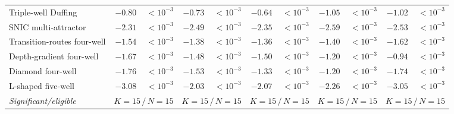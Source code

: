 \begin{tabular}{@{}l rr rr rr rr rr@{}}
Triple-well Duffing & $\mathbf{-0.80}$ & $<\!10^{-3}$ & $\mathbf{-0.73}$ & $<\!10^{-3}$ & $\mathbf{-0.64}$ & $<\!10^{-3}$ & $\mathbf{-1.05}$ & $<\!10^{-3}$ & $\mathbf{-1.02}$ & $<\!10^{-3}$ \\
SNIC multi-attractor & $\mathbf{-2.31}$ & $<\!10^{-3}$ & $\mathbf{-2.49}$ & $<\!10^{-3}$ & $\mathbf{-2.35}$ & $<\!10^{-3}$ & $\mathbf{-2.59}$ & $<\!10^{-3}$ & $\mathbf{-2.53}$ & $<\!10^{-3}$ \\
Transition-routes four-well & $\mathbf{-1.54}$ & $<\!10^{-3}$ & $\mathbf{-1.38}$ & $<\!10^{-3}$ & $\mathbf{-1.36}$ & $<\!10^{-3}$ & $\mathbf{-1.40}$ & $<\!10^{-3}$ & $\mathbf{-1.62}$ & $<\!10^{-3}$ \\
Depth-gradient four-well & $\mathbf{-1.67}$ & $<\!10^{-3}$ & $\mathbf{-1.48}$ & $<\!10^{-3}$ & $\mathbf{-1.50}$ & $<\!10^{-3}$ & $\mathbf{-1.20}$ & $<\!10^{-3}$ & $\mathbf{-0.94}$ & $<\!10^{-3}$ \\
Diamond four-well & $\mathbf{-1.76}$ & $<\!10^{-3}$ & $\mathbf{-1.53}$ & $<\!10^{-3}$ & $\mathbf{-1.33}$ & $<\!10^{-3}$ & $\mathbf{-1.20}$ & $<\!10^{-3}$ & $\mathbf{-1.74}$ & $<\!10^{-3}$ \\
L-shaped five-well & $\mathbf{-3.08}$ & $<\!10^{-3}$ & $\mathbf{-2.03}$ & $<\!10^{-3}$ & $\mathbf{-2.07}$ & $<\!10^{-3}$ & $\mathbf{-2.26}$ & $<\!10^{-3}$ & $\mathbf{-3.05}$ & $<\!10^{-3}$ \\
\midrule
\emph{Significant/eligible} & \multicolumn{2}{c}{$K{=}15\,/\,N{=}15$} & \multicolumn{2}{c}{$K{=}15\,/\,N{=}15$} & \multicolumn{2}{c}{$K{=}15\,/\,N{=}15$} & \multicolumn{2}{c}{$K{=}15\,/\,N{=}15$} & \multicolumn{2}{c}{$K{=}15\,/\,N{=}15$} \\
\bottomrule
\end{tabular}